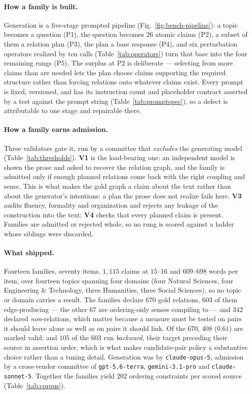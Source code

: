 \paragraph{How a family is built.} Generation is a five-stage prompted pipeline
(Fig.~\ref{fig:bench-pipeline}): a topic becomes a question (P1), the question becomes $26$ atomic
claims (P2), a subset of them a relation plan (P3), the plan a base response (P4), and six
perturbation operators realized by ten calls (Table~\ref{tab:operators}) turn that base into the four
remaining rungs (P5). The surplus at P2 is deliberate --- selecting from more claims than are needed
lets the plan choose claims supporting the required structure rather than forcing relations onto
whatever claims exist. Every prompt is fixed, versioned, and has its instruction count and placeholder
contract asserted by a test against the prompt string (Table~\ref{tab:promptspec}), so a defect is
attributable to one stage and repairable there.

\paragraph{How a family earns admission.} Three validators gate it, run by a committee that
\emph{excludes} the generating model (Table~\ref{tab:thresholds}). \textbf{V1} is the load-bearing
one: an independent model is shown the prose and asked to recover the relation graph, and the family
is admitted only if enough planned relations come back with the right coupling and sense. This is
what makes the gold graph a claim about the text rather than about the generator's intentions: a plan
the prose does not realize fails here. \textbf{V3} audits fluency, formality and organization and
rejects any leakage of the construction into the text; \textbf{V4} checks that every planned claim is
present. Families are admitted or rejected whole, so no rung is scored against a ladder whose siblings
were discarded.

\paragraph{What shipped.} Fourteen families, seventy items, $1{,}115$ claims at $15$--$16$ and
$609$--$698$ words per item, over fourteen topics spanning four domains (four Natural Sciences, four
Engineering \& Technology, three Humanities, three Social Sciences), so no topic or domain carries a
result. The families declare $670$ gold relations, $603$ of them edge-producing --- the other $67$ are
ordering-only senses compiling to  --- and $342$ declared \emph{non}-relations, which
matter because a measure must be tested on pairs it should leave alone as well as on pairs it should
link. Of the $670$, $408$ ($0.61$) are marked valid; and $105$ of the $603$ run \emph{backward}, their
target preceding their source in assertion order, which is what makes candidate-pair policy a
substantive choice rather than a tuning detail. Generation was by \texttt{claude-opus-5}, admission by
a cross-vendor committee of \texttt{gpt-5.6-terra}, \texttt{gemini-3.1-pro} and
\texttt{claude-sonnet-5}. Together the families yield $202$ ordering constraints per scored source
(Table~\ref{tab:corpus}).

